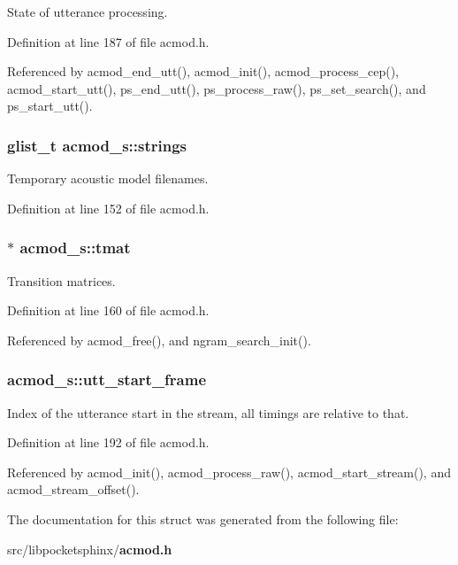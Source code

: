 State of utterance processing. 



Definition at line 187 of file acmod.\-h.



Referenced by acmod\-\_\-end\-\_\-utt(), acmod\-\_\-init(), acmod\-\_\-process\-\_\-cep(), acmod\-\_\-start\-\_\-utt(), ps\-\_\-end\-\_\-utt(), ps\-\_\-process\-\_\-raw(), ps\-\_\-set\-\_\-search(), and ps\-\_\-start\-\_\-utt().

\subsubsection[{strings}]{\setlength{\rightskip}{0pt plus 5cm}glist\-\_\-t acmod\-\_\-s\-::strings}\label{structacmod__s_a9f6b699a0fbd43cf7ababab6f0ab81be}


Temporary acoustic model filenames. 



Definition at line 152 of file acmod.\-h.

\subsubsection[{tmat}]{$\ast$ acmod\-\_\-s\-::tmat}\label{structacmod__s_aaa3982184a49f0d61e397ba89f486259}


Transition matrices. 



Definition at line 160 of file acmod.\-h.



Referenced by acmod\-\_\-free(), and ngram\-\_\-search\-\_\-init().

\subsubsection[{utt\-\_\-start\-\_\-frame}]{ acmod\-\_\-s\-::utt\-\_\-start\-\_\-frame}\label{structacmod__s_aecf7cf72f18a8ecb1cc8e96928bc1ad4}


Index of the utterance start in the stream, all timings are relative to that. 



Definition at line 192 of file acmod.\-h.



Referenced by acmod\-\_\-init(), acmod\-\_\-process\-\_\-raw(), acmod\-\_\-start\-\_\-stream(), and acmod\-\_\-stream\-\_\-offset().



The documentation for this struct was generated from the following file\-:\begin{DoxyCompactItemize}
\item 
src/libpocketsphinx/{\bf acmod.\-h}\end{DoxyCompactItemize}
